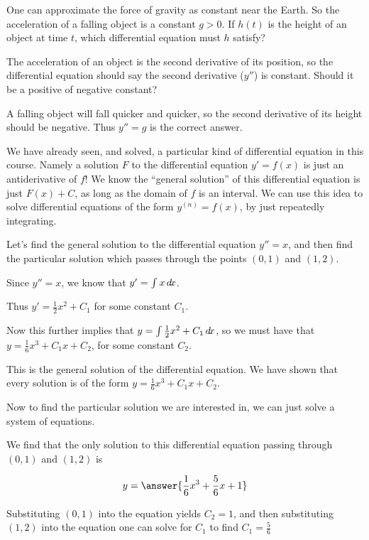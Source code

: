 \documentclass{ximera}
\begin{document}
\begin{question}
	One can approximate the force of gravity as constant near the Earth.  So the acceleration of a falling object is a constant $g>0$.  If $h(t)$ is the height of an object at time $t$, which differential equation must $h$ satisfy?
	
	\begin{multipleChoice}
	\end{multipleChoice}
	
	\begin{hint}
		The acceleration of an object is the second derivative of its position, so the differential equation should say the second derivative ($y''$) is constant.  Should it be a positive of negative constant?
	\end{hint}
	\begin{hint}
		A falling object will fall quicker and quicker, so the second derivative of its height should be negative.  Thus $y''=g$ is the correct answer.
	\end{hint}	
\end{question}

We have already seen, and solved, a particular kind of differential equation in this course.  Namely a solution $F$ to the differential equation $y' = f(x)$ is just an antiderivative of $f$!  We know the ``general solution'' of this differential equation is just $F(x)+C$, as long as the domain of $f$ is an interval.  We can use this idea to solve differential equations of the form $y^{(n)} = f(x)$, by just repeatedly integrating.

\begin{example}
Let's find the general solution to the differential equation $y'' =  x$, and then find the particular solution which passes through the points $(0,1)$ and $(1,2)$.

Since $y'' = x$, we know that $y' = \int x \mathop{}\!d\! x$. 

 Thus $y' = \frac{1}{2} x^2 + C_1$ for some constant $C_1$.  
 
Now this further implies that $y = \int \frac{1}{2} x^2 + C_1 \mathop{}\!d\! x$, so 
we must have that $y = \frac{1}{6}x^3+C_1x+C_2$, for some constant $C_2$.

This is the general solution of the differential equation.  We have shown that every solution is of the form $y = \frac{1}{6}x^3+C_1x+C_2$.

Now to find the particular solution we are interested in, we can just solve a system of equations.

We find that the only solution to this differential equation passing through $(0,1)$ and $(1,2)$ is 

\[
y = \answer{\frac{1}{6}x^3+\frac{5}{6}x+1}
\]

\begin{hint}
	Substituting $(0,1)$ into the equation yields $C_2 = 1$, and then substituting $(1,2)$ into the equation one can solve for $C_1$ to find $C_1 = \frac{5}{6}$
\end{hint}


\end{example}
\end{document}
